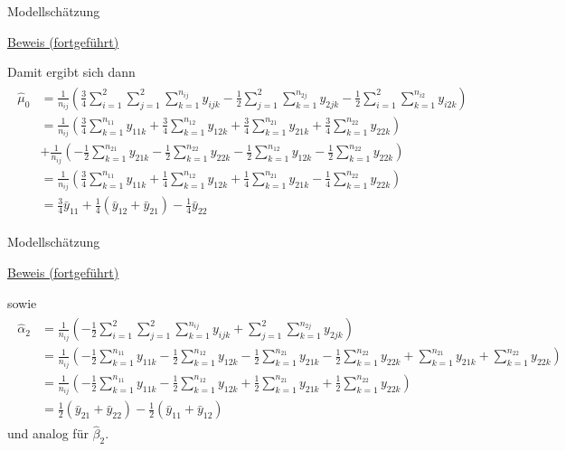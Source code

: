\documentclass[
  8pt,
  ignorenonframetext,
]{beamer}
\begin{document}
\begin{frame}{Modellschätzung}
\protect\hypertarget{modellschuxe4tzung-4}{}
\footnotesize

\underline{Beweis (fortgeführt)}

Damit ergibt sich dann \tiny \begin{align}
\begin{split}
\hat{\mu}_0
& =
\frac{1}{n_{ij}}
\left(
  \frac{3}{4}\sum_{i=1}^2 \sum_{j=1}^2 \sum_{k = 1}^{n_{ij}} y_{ijk}
- \frac{1}{2}\sum_{j=1}^2 \sum_{k = 1}^{n_{2j}} y_{2jk}
- \frac{1}{2}\sum_{i=1}^2 \sum_{k = 1}^{n_{i2}} y_{i2k}
\right)
\\
& =
\frac{1}{n_{ij}}
\left(
  \frac{3}{4}\sum_{k = 1}^{n_{11}} y_{11k}
+ \frac{3}{4}\sum_{k = 1}^{n_{12}} y_{12k}
+ \frac{3}{4}\sum_{k = 1}^{n_{21}} y_{21k}
+ \frac{3}{4}\sum_{k = 1}^{n_{22}} y_{22k}
\right)
\\
&
+ \frac{1}{n_{ij}}
\left(
- \frac{1}{2}\sum_{k = 1}^{n_{21}} y_{21k} - \frac{1}{2}\sum_{k = 1}^{n_{22}} y_{22k}
- \frac{1}{2}\sum_{k = 1}^{n_{12}} y_{12k} - \frac{1}{2}\sum_{k = 1}^{n_{22}} y_{22k}
\right)
\\
& = \frac{1}{n_{ij}}
\left(
  \frac{3}{4}\sum_{k = 1}^{n_{11}} y_{11k}
+ \frac{1}{4}\sum_{k = 1}^{n_{12}} y_{12k}
+ \frac{1}{4}\sum_{k = 1}^{n_{21}} y_{21k}
- \frac{1}{4}\sum_{k = 1}^{n_{22}} y_{22k}
\right)
\\
& =
  \frac{3}{4}\bar{y}_{11}
+ \frac{1}{4}(\bar{y}_{12} + \bar{y}_{21})
- \frac{1}{4}\bar{y}_{22}
\end{split}
\end{align}
\end{frame}

\begin{frame}{Modellschätzung}
\protect\hypertarget{modellschuxe4tzung-5}{}
\footnotesize

\underline{Beweis (fortgeführt)}

sowie \tiny \begin{align}
\begin{split}
\hat{\alpha}_2
& =
\frac{1}{n_{ij}}
\left(
- \frac{1}{2} \sum_{i=1}^2 \sum_{j=1}^2 \sum_{k = 1}^{n_{ij}} y_{ijk} + \sum_{j=1}^2 \sum_{k = 1}^{n_{2j}} y_{2jk}
\right)
\\
& =
\frac{1}{n_{ij}}
\left(
- \frac{1}{2}\sum_{k = 1}^{n_{11}} y_{11k}
- \frac{1}{2}\sum_{k = 1}^{n_{12}} y_{12k}
- \frac{1}{2}\sum_{k = 1}^{n_{21}} y_{21k}
- \frac{1}{2}\sum_{k = 1}^{n_{22}} y_{22k}
+            \sum_{k = 1}^{n_{21}} y_{21k}
+            \sum_{k = 1}^{n_{22}} y_{22k}
\right)
\\
& =
\frac{1}{n_{ij}}
\left(
- \frac{1}{2}\sum_{k = 1}^{n_{11}} y_{11k}
- \frac{1}{2}\sum_{k = 1}^{n_{12}} y_{12k}
+ \frac{1}{2}\sum_{k = 1}^{n_{21}} y_{21k}
+ \frac{1}{2}\sum_{k = 1}^{n_{22}} y_{22k}
\right)
\\
& = \frac{1}{2}(\bar{y}_{21} + \bar{y}_{22}) - \frac{1}{2}(\bar{y}_{11} + \bar{y}_{12})
\end{split}
\end{align} \footnotesize und analog für \(\hat{\beta}_2\).
\end{frame}
\end{document}

